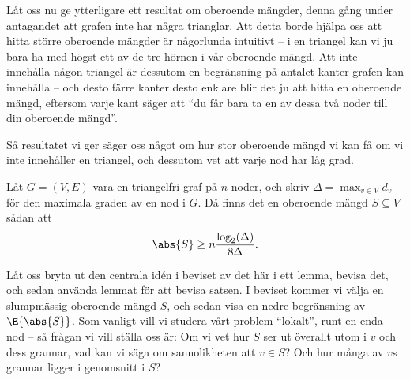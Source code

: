 \documentclass[nobib]{tufte-handout}
\begin{document}
Låt oss nu ge ytterligare ett resultat om oberoende mängder, denna gång under antagandet att grafen inte har några trianglar. Att detta borde hjälpa oss att hitta större oberoende mängder är någorlunda intuitivt -- i en triangel kan vi ju bara ha med högst ett av de tre hörnen i vår oberoende mängd. Att inte innehålla någon triangel är dessutom en begränsning på antalet kanter grafen kan innehålla 
-- och desto färre kanter desto enklare blir det ju att hitta en oberoende mängd, eftersom varje kant säger att ``du får bara ta en av dessa två noder till din oberoende mängd''.

Så resultatet vi ger säger oss något om hur stor oberoende mängd vi kan få om vi inte innehåller en triangel, och dessutom vet att varje nod har låg grad.

\begin{theorem}\label{thm:shearer_triangle_free_indep_set}
  Låt $G = (V, E)$ vara en triangelfri graf på $n$ noder, och skriv $\Delta = \max_{v \in V} d_v$ för den maximala graden av en nod i $G$. Då finns det en oberoende mängd $S \subseteq V$ sådan att
  $$\abs{S} \geq n\frac{\log_2(\Delta)}{8\Delta}.$$
\end{theorem}

Låt oss bryta ut den centrala idén i beviset av det här i ett lemma, bevisa det, och sedan använda lemmat för att bevisa satsen. I beviset kommer vi välja en slumpmässig oberoende mängd $S$, och sedan visa en nedre begränsning av $\E{\abs{S}}$. Som vanligt vill vi studera vårt problem ``lokalt'', runt en enda nod -- så frågan vi vill ställa oss är: Om vi vet hur $S$ ser ut överallt utom i $v$ och dess grannar, vad kan vi säga om sannolikheten att $v \in S$? Och hur många av $v$s grannar ligger i genomsnitt i $S$?
\end{document}
